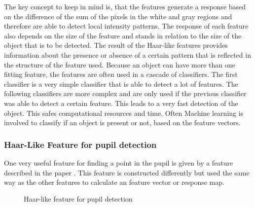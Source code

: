 The key concept to keep in mind is, that the features generate a response based on the difference of the sum of the pixels in the white and gray regions and therefore are able to detect local intensity patterns. The response of each feature also depends on the size of the feature and stands in relation to the size of the object that is to be detected. The result of the Haar-like features provides information about the presence or absence of a certain pattern that is reflected in the structure of the feature used. Because an object can have more than one fitting feature, the features are often used in a cascade of classifiers. The first classifier is a very simple classifier that is able to detect a lot of features. The following classifiers are more complex and are only used if the previous classifier was able to detect a certain feature. This leads to a very fast detection of the object. This safes computational resources and time. Often Machine learning is involved to classify if an object is present or not, based on the feature vectors. 

\subsubsection{Haar-Like Feature for pupil detection}
One very useful feature for finding a point in the pupil is given by a feature described in the paper \cite{pupil_haar}. This feature is constructed differently but used the same way as the other features to calculate an feature vector or response map. 
\begin{figure}
    \centering
\label{haar_pupil}
\caption{Haar-like feature for pupil detection}
\end{figure}


